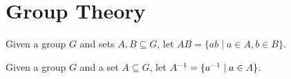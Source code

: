 \section{Group Theory}

\begin{definition}
    Given a group $G$ and sets $A, B \subseteq G$,
    let $AB = \{ ab \mid a \in A, b \in B \}$.
\end{definition}

\begin{definition}
    Given a group $G$ and a set $A \subseteq G$,
    let ${A}^{-1} = \{ {a}^{-1} \mid a \in A \}$.
\end{definition}
